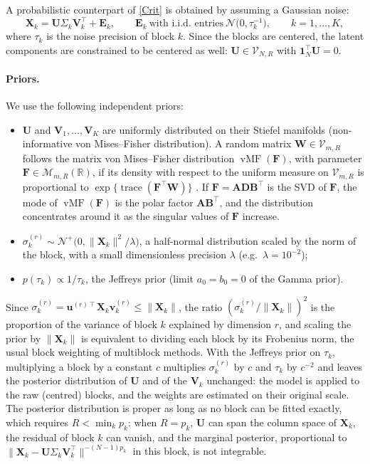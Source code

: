 \documentclass[11pt]{article}
\DeclareMathOperator{\trace}{\mathrm{trace}}
\DeclareMathOperator{\vMF}{vMF}
\newcommand{\X}{\mathbf{X}}
\newcommand{\U}{\mathbf{U}}
\newcommand{\V}{\mathbf{V}}
\newcommand{\EE}{\mathbf{E}}
\newcommand{\F}{\mathbf{F}}
\newcommand{\W}{\mathbf{W}}
\newcommand{\uu}{\mathbf{u}}
\newcommand{\vv}{\mathbf{v}}
\newcommand{\one}{\mathbf{1}}
\newcommand{\Stiefel}[2]{\mathcal V_{#1,#2}}
\begin{document}
A probabilistic counterpart of \eqref{Crit} is obtained by assuming a Gaussian noise:
\begin{equation}
  \X_k=\U\Sigma_k\V_k^\intercal+\EE_k,\qquad
  \EE_k\ \text{with i.i.d. entries}\ \mathcal N\bigl(0,\tau_k^{-1}\bigr),\qquad k=1,\ldots,K,
  \label{eq:model}
\end{equation}
where $\tau_k$ is the noise precision of block $k$. Since the blocks are centered, the latent components are constrained to be
centered as well: $\U\in\Stiefel{N}{R}$ with $\one_N^\intercal\U=0$.

\paragraph{Priors.} We use the following independent priors:
\begin{itemize}
  \item $\U$ and $\V_1,\ldots,\V_K$ are uniformly distributed on their Stiefel manifolds (non-informative von Mises--Fisher distribution). A random matrix $\W\in\Stiefel{m}{R}$ follows the matrix von Mises--Fisher distribution $\vMF(\F)$, with parameter $\F\in\mathcal M_{m,R}(\mathbb R)$, if its density with
respect to the uniform measure on $\Stiefel{m}{R}$ is proportional to $\exp\{\trace(\F^\intercal\W)\}$
\citep{hoff2009}. If $\F=\mathbf A\mathbf D\mathbf B^\intercal$ is the SVD of $\F$, the mode of $\vMF(\F)$ is the
polar factor $\mathbf A\mathbf B^\intercal$, and the distribution concentrates around it as the singular values of $\F$ increase.
  \item $\sigma_k^{(r)}\sim\mathcal N^+\bigl(0,\|\X_k\|^2/\lambda\bigr)$, a half-normal distribution scaled by the norm of the block, with a small dimensionless precision $\lambda$ (e.g.\ $\lambda=10^{-2}$);
  \item $p(\tau_k)\propto1/\tau_k$, the Jeffreys prior (limit $a_0=b_0=0$ of the Gamma prior).
\end{itemize}
Since $\sigma_k^{(r)}=\uu^{(r)\intercal}\X_k\vv_k^{(r)}\le\|\X_k\|$, the ratio $(\sigma_k^{(r)}/\|\X_k\|)^2$ is the proportion of the variance of block $k$ explained by dimension $r$, and scaling the prior by $\|\X_k\|$ is equivalent to dividing each block by its Frobenius norm, the usual block weighting of multiblock methods. With the Jeffreys prior on $\tau_k$, multiplying a block by a constant $c$ multiplies $\sigma_k^{(r)}$ by $c$ and $\tau_k$ by $c^{-2}$ and leaves the posterior distribution of $\U$ and of the $\V_k$ unchanged: the model is applied to the raw (centred) blocks, and the weights are estimated on their original scale. The posterior distribution is proper as long as no block can be fitted exactly, which requires $R<\min_kp_k$: when $R=p_k$, $\U$ can span the column space of $\X_k$, the residual of block $k$ can vanish, and the marginal posterior, proportional to $\|\X_k-\U\Sigma_k\V_k^\intercal\|^{-(N-1)p_k}$ in this block, is not integrable.
\end{document}
